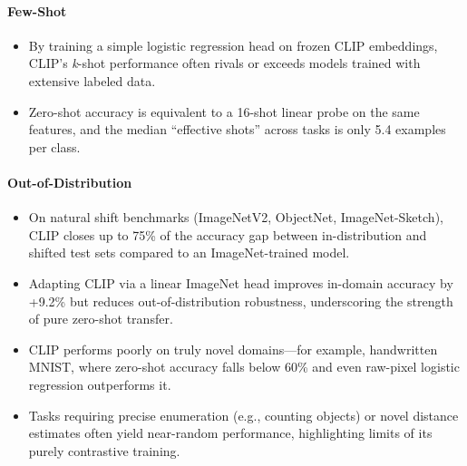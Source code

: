 \documentclass[10pt]{article}
\begin{document}
\paragraph{Few-Shot}
\begin{itemize}
    \item By training a simple logistic regression head on frozen CLIP embeddings, CLIP's \emph{k}-shot performance often rivals or exceeds models trained with extensive labeled data.
    \item Zero-shot accuracy is equivalent to a 16-shot linear probe on the same features, and the median “effective shots” across tasks is only 5.4 examples per class.
\end{itemize}

\paragraph{Out-of-Distribution}
\begin{itemize}
    \item On natural shift benchmarks (ImageNetV2, ObjectNet, ImageNet-Sketch), CLIP closes up to 75\% of the accuracy gap between in-distribution and shifted test sets compared to an ImageNet-trained model.
    \item Adapting CLIP via a linear ImageNet head improves in-domain accuracy by +9.2\% but reduces out-of-distribution robustness, underscoring the strength of pure zero-shot transfer.
    \item CLIP performs poorly on truly novel domains—for example, handwritten MNIST, where zero-shot accuracy falls below 60\% and even raw-pixel logistic regression outperforms it.
    \item Tasks requiring precise enumeration (e.g., counting objects) or novel distance estimates often yield near-random performance, highlighting limits of its purely contrastive training.
\end{itemize}
\end{document}

